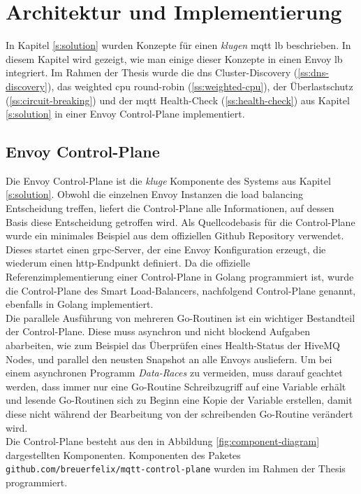 \section{Architektur und Implementierung} \label{s:implementation}
In Kapitel \ref{s:solution} wurden Konzepte für einen \textit{klugen} \ac{mqtt} \acl{lb} beschrieben. In diesem Kapitel wird gezeigt, wie man einige dieser Konzepte in einen Envoy \acl{lb} integriert.
Im Rahmen der Thesis wurde die \ac{dns} Cluster-Discovery (\ref{ss:dns-discovery}), das weighted \ac{cpu} round-robin (\ref{ss:weighted-cpu}), der Überlastschutz (\ref{ss:circuit-breaking}) und der \ac{mqtt} Health-Check (\ref{ss:health-check}) aus Kapitel \ref{s:solution} in einer Envoy Control-Plane implementiert.

\subsection{Envoy Control-Plane} \label{si:control-plane}
Die Envoy Control-Plane ist die \textit{kluge} Komponente des Systems aus Kapitel \ref{s:solution}. Obwohl die einzelnen Envoy Instanzen die load balancing Entscheidung treffen, liefert die Control-Plane alle Informationen, auf dessen Basis diese Entscheidung getroffen wird.
Als Quellcodebasis für die Control-Plane wurde ein minimales Beispiel aus dem offiziellen Github Repository \cite{EnvoyproxyGocontrolplane} verwendet.
Dieses startet einen g\acs{rpc}-Server, der eine Envoy Konfiguration erzeugt, die wiederum einen \ac{http}-Endpunkt definiert. Da die offizielle Referenzimplementierung einer Control-Plane in Golang programmiert ist, wurde die Control-Plane des Smart Load-Balancers, nachfolgend Control-Plane genannt, ebenfalls in Golang implementiert.
\\
Die parallele Ausführung von mehreren Go-Routinen ist ein wichtiger Bestandteil der Control-Plane. Diese muss asynchron und nicht blockend Aufgaben abarbeiten, wie zum Beispiel das Überprüfen eines Health-Status der HiveMQ Nodes, und parallel den neusten Snapshot an alle Envoys ausliefern.
Um bei einem asynchronen Programm \textit{Data-Races} zu vermeiden, muss darauf geachtet werden, dass immer nur eine Go-Routine Schreibzugriff auf eine Variable erhält und lesende Go-Routinen sich zu Beginn eine Kopie der Variable erstellen, damit diese nicht während der Bearbeitung von der schreibenden Go-Routine verändert wird.
\\
Die Control-Plane besteht aus den in Abbildung \ref{fig:component-diagram} dargestellten Komponenten. Komponenten des Paketes \verb|github.com/breuerfelix/mqtt-control-plane| wurden im Rahmen der Thesis programmiert.
